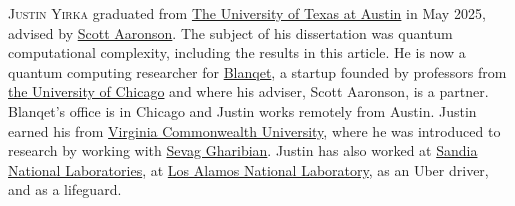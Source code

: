 \documentclass{toc}
\begin{document}
%
%
%
%
%
%
%
%
%
%
%
%
%
%
%
%
%
%
%
%
\begin{tocaboutauthors}
\begin{tocabout}[yirka]  %
  \textsc{Justin Yirka} graduated from
  \href{https://www.utexas.edu/}{The University of Texas at Austin}
  in May 2025, advised by
  \href{https://scottaaronson.com/}{Scott Aaronson}.
  The subject of his dissertation was quantum computational 
  complexity, including the results in this article. 
%
  He is now a quantum computing researcher for \href{http://blanqet.net/}{Blanqet}, 
  a startup founded by professors from
  \href{https://www.uchicago.edu/}{the University of Chicago}
  and where his \phd{} adviser, Scott Aaronson, is a partner.
  Blanqet's office is in Chicago and Justin works remotely from Austin.
  Justin earned his \bsc{} from \href{https://www.vcu.edu/}{Virginia Commonwealth University}, 
  where he was introduced to research by working with \href{https://groups.uni-paderborn.de/fg-qi/}{Sevag Gharibian}.
  Justin has also worked at \href{https://www.sandia.gov/}{Sandia National Laboratories}, at \href{https://www.lanl.gov/}{Los Alamos National Laboratory}, 
as an Uber driver, and as a lifeguard.
\end{tocabout}
\end{tocaboutauthors}
\end{document}
